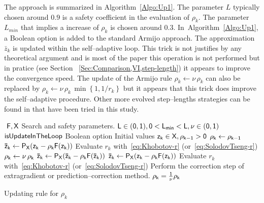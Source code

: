   The approach is summarized in Algorithm~\ref{Algo:Up1}. The parameter $L$ typically chosen around $0.9$ is a safety coefficient in the evaluation of $\rho_k$. The parameter $L_{min}$ that implies a increase of $\rho_k$ is chosen around $0.3$.
In~Algorithm~\ref{Algo:Up1}, a Boolean option is added to the standard Armijo approach. The approximation $\bar z_k$ is updated within the self--adaptive loop. This trick is not justifies by any theoretical argument and is most of the paper this operation is not performed but in pratice (see Section ~\ref{Sec:Comparison,VI,step-length}) it appears to improve the convergence speed.
 The update of the Armijo rule $\rho_k \leftarrow \nu \,\rho_k$ can also be replaced by  $\rho_k \leftarrow \nu \,\rho_k\, \min\left\{1, 1/r_k\right\}$ but it appears that this trick does improve the self--adaptive procedure. Other more evolved step--lengths strategies can be found in \citep{Wang_JCAM2010} that have been tried in this study.

\begin{algorithm}
  \begin{algorithmic}
    {\sf
      \STATE $ $
      \REQUIRE $\sf F,X$
      \REQUIRE Search and safety parameters. $\sf L \in (0,1), 0< L_{min} < L, \nu \in (0,1)$
      \REQUIRE $\sf isUpdateInTheLoop$ Boolean option
      \REQUIRE Initial values $\sf z_k \in X, \rho_{k-1} >0$
      \STATE $\sf \rho_k \leftarrow \rho_{k-1}$
      \STATE $\sf \bar z_{k} \leftarrow P_X(z_k-\rho_k F(z_k))$
      \STATE Evaluate $r_k$ with~\eqref{eq:Khobotov-r} (or~\eqref{eq:SolodovTseng-r})
      \STATE $\sf \rho_k \leftarrow \nu \,\rho_k$ 
      \STATE $\sf \bar z_{k} \leftarrow P_X(\bar z_k-\rho_k F(\bar z_k))$
      \ELSE
      \STATE $\sf \bar z_{k} \leftarrow P_X(z_k-\rho_k F(z_k))$
      \ENDIF
      \STATE Evaluate $r_k$ with~\eqref{eq:Khobotov-r} (or~\eqref{eq:SolodovTseng-r})
      \ENDWHILE
      \STATE Perform the correction step of extragradient or prediction--correction method.
      \STATE $\sf \rho_k = \frac 1 \nu \rho_k$ 
      \ENDIF
    }
  \end{algorithmic}
  \caption{Updating rule for $\rho_k$}  \label{Algo:Up1}
\end{algorithm}

